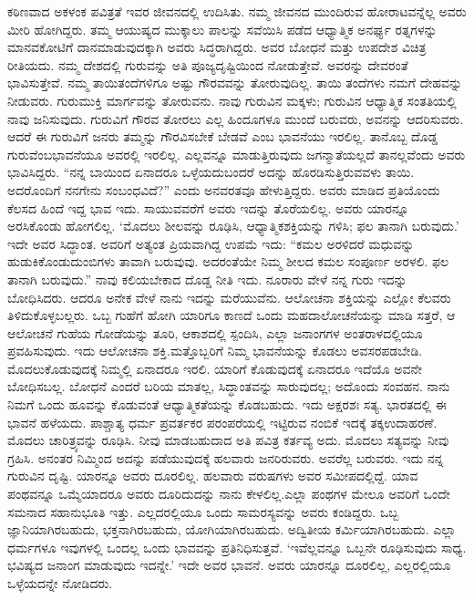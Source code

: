 ಕಠಿಣವಾದ ಅಕಳಂಕ ಪವಿತ್ರತೆ ಇವರ ಜೀವನದಲ್ಲಿ ಉದಿಸಿತು. ನಮ್ಮ ಜೀವನದ ಮುಂದಿರುವ ಹೋರಾಟವನ್ನೆಲ್ಲ ಅವರು ಮೀರಿ ಹೋಗಿದ್ದರು. ತಮ್ಮ ಆಯುಷ್ಯದ ಮುಕ್ಕಾಲು ಪಾಲನ್ನು ಸವೆಯಿಸಿ ಪಡೆದ ಆಧ್ಯಾತ್ಮಿಕ ಅನರ್ಘ್ಯ ರತ್ನಗಳನ್ನು ಮಾನವಕೋಟಿಗೆ ದಾನಮಾಡುವುದಕ್ಕಾಗಿ ಅವರು ಸಿದ್ಧರಾಗಿದ್ದರು. ಅವರ ಬೋಧನೆ ಮತ್ತು ಉಪದೇಶ ವಿಚಿತ್ರ ರೀತಿಯದು. ನಮ್ಮ ದೇಶದಲ್ಲಿ ಗುರುವನ್ನು ಅತಿ ಪೂಜ್ಯದೃಷ್ಟಿಯಿಂದ ನೋಡುತ್ತೇವೆ. ಅವರನ್ನು ದೇವರಂತೆ ಭಾವಿಸುತ್ತೇವೆ. ನಮ್ಮ ತಾಯಿತಂದೆಗಳಿಗೂ ಅಷ್ಟು ಗೌರವವನ್ನು ತೋರುವುದಿಲ್ಲ. ತಾಯಿ ತಂದೆಗಳು ನಮಗೆ ದೇಹವನ್ನು ನೀಡುವರು. ಗುರು\break ಮುಕ್ತಿ ಮಾರ್ಗವನ್ನು ತೋರುವನು. ನಾವು ಗುರುವಿನ ಮಕ್ಕಳು; ಗುರುವಿನ ಆಧ್ಯಾತ್ಮಿಕ ಸಂತತಿಯಲ್ಲಿ ನಾವು ಜನಿಸುವುದು. ಗುರುವಿಗೆ ಗೌರವ ತೋರಲು ಎಲ್ಲ ಹಿಂದೂಗಳೂ ಮುಂದೆ ಬರುವರು, ಅವನನ್ನು ಆದರಿಸುವರು. ಆದರೆ ಈ ಗುರುವಿಗೆ ಜನರು ತಮ್ಮನ್ನು ಗೌರವಿಸಬೇಕೆ ಬೇಡವೆ ಎಂಬ ಭಾವನೆಯು ಇರಲಿಲ್ಲ. ತಾನೊಬ್ಬ ದೊಡ್ಡ ಗುರುವೆಂಬ\break ಭಾವನೆಯೂ ಅವರಲ್ಲಿ ಇರಲಿಲ್ಲ. ಎಲ್ಲವನ್ನೂ ಮಾಡುತ್ತಿರುವುದು ಜಗನ್ಮಾತೆಯಲ್ಲದೆ ತಾನಲ್ಲವೆಂದು ಅವರು ಭಾವಿಸಿದ್ದರು. “ನನ್ನ ಬಾಯಿಂದ ಏನಾದರೂ ಒಳ್ಳೆಯದು\break ಬಂದರೆ ಅದನ್ನು ಹೊರಡಿಸುತ್ತಿರುವವಳು ತಾಯಿ. ಅದರೊಂದಿಗೆ ನನಗೇನು ಸಂಬಂಧವಿದೆ?” ಎಂದು ಅನವರತವೂ ಹೇಳುತ್ತಿದ್ದರು. ಅವರು ಮಾಡಿದ ಪ್ರತಿಯೊಂದು ಕೆಲಸದ ಹಿಂದೆ ಇದ್ದ ಭಾವ ಇದು. ಸಾಯುವವರೆಗೆ ಅವರು ಇದನ್ನು ತೊರೆಯಲಿಲ್ಲ. ಅವರು ಯಾರನ್ನೂ ಅರಸಿಕೊಂಡು ಹೋಗಲಿಲ್ಲ. ‘ಮೊದಲು ಶೀಲವನ್ನು ರೂಢಿಸಿ, ಆಧ್ಯಾತ್ಮಿಕ\break ಶಕ್ತಿಯನ್ನು ಗಳಿಸಿ; ಫಲ ತಾನಾಗಿ ಬರುವುದು.’ ಇದೇ ಅವರ ಸಿದ್ಧಾಂತ. ಅವರಿಗೆ ಅತ್ಯಂತ ಪ್ರಿಯವಾಗಿದ್ದ ಉಪಮೆ ಇದು: “ಕಮಲ ಅರಳಿದರೆ ಮಧುವನ್ನು ಹುಡುಕಿಕೊಂಡು\break ದುಂಬಿಗಳು ತಾವಾಗಿ ಬರುವುವು. ಅದರಂತೆಯೇ ನಿಮ್ಮ ಶೀಲದ ಕಮಲ ಸಂಪೂರ್ಣ ಅರಳಲಿ. ಫಲ ತಾನಾಗಿ ಬರುವುದು.” ನಾವು ಕಲಿಯಬೇಕಾದ ದೊಡ್ಡ ನೀತಿ ಇದು. ನೂರಾರು ವೇಳೆ ನನ್ನ ಗುರು ಇದನ್ನು ಬೋಧಿಸಿದರು. ಆದರೂ ಅನೇಕ ವೇಳೆ ನಾನು ಇದನ್ನು ಮರೆಯುವೆನು. ಆಲೋಚನಾ ಶಕ್ತಿಯನ್ನು ಎಲ್ಲೋ ಕೆಲವರು ತಿಳಿದುಕೊಳ್ಳಬಲ್ಲರು. ಒಬ್ಬ ಗುಹೆಗೆ ಹೋಗಿ ಯಾರಿಗೂ ಕಾಣದೆ ಒಂದು ಮಹದಾಲೋಚನೆಯನ್ನು ಮಾಡಿ ಸತ್ತರೆ, ಆ ಆಲೋಚನೆ ಗುಹೆಯ ಗೋಡೆಯನ್ನು ತೂರಿ, ಆಕಾಶದಲ್ಲಿ ಸ್ಪಂದಿಸಿ, ಎಲ್ಲಾ ಜನಾಂಗಗಳ ಅಂತರಾಳದಲ್ಲಿಯೂ ಪ್ರವಹಿಸುವುದು. ಇದು ಆಲೋಚನಾ ಶಕ್ತಿ.\break ಮತ್ತೊಬ್ಬರಿಗೆ ನಿಮ್ಮ ಭಾವನೆಯನ್ನು ಕೊಡಲು ಅವಸರಪಡಬೇಡಿ. ಮೊದಲು\break ಕೊಡುವುದಕ್ಕೆ ನಿಮ್ಮಲ್ಲಿ ಏನಾದರೂ ಇರಲಿ. ಯಾರಿಗೆ ಕೊಡುವುದಕ್ಕೆ ಏನಾದರೂ ಇದೆಯೊ ಅವನೇ ಬೋಧಿಸಬಲ್ಲ. ಬೋಧನೆ ಎಂದರೆ ಬರಿಯ ಮಾತಲ್ಲ, ಸಿದ್ಧಾಂತವನ್ನು ಸಾರುವುದಲ್ಲ; ಅದೊಂದು ಸಂವಹನ. ನಾನು ನಿಮಗೆ ಒಂದು ಹೂವನ್ನು ಕೊಡುವಂತೆ ಆಧ್ಯಾತ್ಮಿಕತೆ\-ಯನ್ನು ಕೊಡಬಹುದು. ಇದು ಅಕ್ಷರಶಃ ಸತ್ಯ. ಭಾರತದಲ್ಲಿ ಈ ಭಾವನೆ ಹಳೆ\-ಯದು. ಪಾಶ್ಚಾತ್ಯ ಧರ್ಮ ಪ್ರವರ್ತಕರ ಪರಂಪರೆಯಲ್ಲಿ ಇಟ್ಟಿರುವ ನಂಬಿಕೆ ಇದಕ್ಕೆ ತಕ್ಕ\break ಉದಾಹರಣೆ. ಮೊದಲು ಚಾರಿತ್ರ್ಯವನ್ನು ರೂಢಿಸಿ. ನೀವು ಮಾಡಬಹುದಾದ ಅತಿ ಪವಿತ್ರ ಕರ್ತವ್ಯ ಅದು. ಮೊದಲು ಸತ್ಯವನ್ನು ನೀವು ಗ್ರಹಿಸಿ. ಅನಂತರ ನಿಮ್ಮಿಂದ ಅದನ್ನು ಪಡೆಯುವುದಕ್ಕೆ ಹಲವಾರು ಜನರಿರುವರು. ಅವರೆಲ್ಲ ಬರುವರು. ಇದು ನನ್ನ ಗುರುವಿನ ದೃಷ್ಟಿ. ಯಾರನ್ನೂ ಅವರು ದೂರಲಿಲ್ಲ. ಹಲವಾರು ವರುಷಗಳು ಅವರ ಸಮೀಪದಲ್ಲಿದ್ದೆ. ಯಾವ ಪಂಥವನ್ನೂ ಒಮ್ಮೆಯಾದರೂ ಅವರು ದೂರಿದುದನ್ನು ನಾನು ಕೇಳಲಿಲ್ಲ.\break ಎಲ್ಲಾ ಪಂಥಗಳ ಮೇಲೂ ಅವರಿಗೆ ಒಂದೇ ಸಮನಾದ ಸಹಾನುಭೂತಿ ಇತ್ತು. ಎಲ್ಲದರಲ್ಲಿಯೂ ಒಂದು ಸಾಮರಸ್ಯವನ್ನು ಅವರು ಕಂಡಿದ್ದರು. ಒಬ್ಬ ಜ್ಞಾನಿಯಾಗಿರಬಹುದು, ಭಕ್ತನಾಗಿರಬಹುದು, ಯೋಗಿಯಾಗಿರಬಹುದು. ಅದ್ವಿತೀಯ ಕರ್ಮಿಯಾಗಿರಬಹುದು. ಎಲ್ಲಾ ಧರ್ಮಗಳೂ ಇವುಗಳಲ್ಲಿ ಒಂದಲ್ಲ ಒಂದು ಭಾವವನ್ನು ಪ್ರತಿನಿಧಿಸುತ್ತವೆ. ‘ಇವೆಲ್ಲವನ್ನೂ ಒಬ್ಬನೇ ರೂಢಿಸುವುದು ಸಾಧ್ಯ. ಭವಿಷ್ಯದ ಜನಾಂಗ ಮಾಡುವುದು ಇದನ್ನೇ.’ ಇದೇ ಅವರ ಭಾವನೆ. ಅವರು ಯಾರನ್ನೂ ದೂರಲಿಲ್ಲ, ಎಲ್ಲರಲ್ಲಿಯೂ ಒಳ್ಳೆಯದನ್ನೇ ನೋಡಿದರು.

